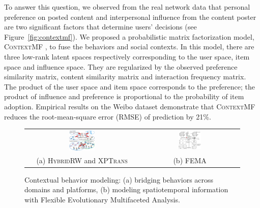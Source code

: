 \documentclass[10.5pt]{article}
\begin{document}
To answer this question, we observed from the real network data that personal preference on posted content and interpersonal influence from the content poster are two significant factors that determine users' decisions (see Figure~\ref{fig:contextmf}). We proposed a probabilistic matrix factorization model, \textsc{ContextMF} \cite{jiang2012socialcontextual}, to fuse the behaviors and social contexts. In this model, there are three low-rank latent spaces respectively corresponding to the user space, item space and influence space. They are regularized by the observed preference similarity matrix, content similarity matrix and interaction frequency matrix. The product of the user space and item space corresponds to the preference; the product of influence and preference is proportional to the probability of item adoption. Empirical results on the Weibo dataset demonstrate that \textsc{ContextMF} reduces the root-mean-square error (RMSE) of prediction by 21\%.

\begin{figure}
\vskip -0.07in
\begin{tabular}{cc}
\includegraphics[width=0.235\textwidth]{figure/hybridrw-xptrans.pdf}
& \includegraphics[width=0.235\textwidth]{figure/fema.pdf} \\
(a) \textsc{HybridRW} and \textsc{XPTrans}
& (b) \textsc{FEMA}
\end{tabular}
\vskip -0.12in
\caption{Contextual behavior modeling: (a) bridging behaviors across domains and platforms, (b) modeling spatiotemporal information with Flexible Evolutionary Multifaceted Analysis.}
\label{fig:fema}
\vskip -0.12in
\end{figure}
\end{document}
